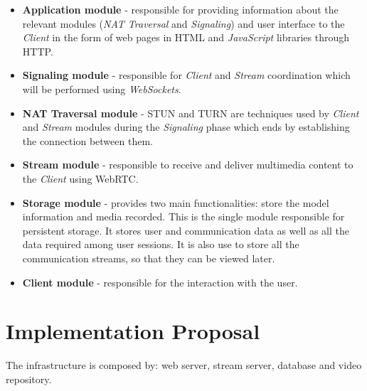 \begin{itemize}

\item \textbf{Application module} - responsible for providing information about the relevant modules (\emph{NAT Traversal} and \emph{Signaling}) and user interface to the \emph{Client} in the form of web pages in \ac{HTML} and \emph{JavaScript} libraries through \ac{HTTP}.
 
\item \textbf{Signaling module} - responsible for \emph{Client} and \emph{Stream} coordination which will be performed using \emph{WebSockets}.

 \item \textbf{NAT Traversal module} - \ac{STUN} and \ac{TURN} are techniques used by \emph{Client} and \emph{Stream} modules during the \emph{Signaling} phase which ends by establishing the connection between them.

 \item \textbf{Stream module} - responsible to receive and deliver multimedia content to the \emph{Client} using \ac{WebRTC}. 

 \item \textbf{Storage module} - provides two main functionalities: store the model information and media recorded. This is the single module responsible for persistent storage. It stores user and communication data as well as all the data required among user sessions. It is also use to store all the communication streams, so that they can be viewed later.

 \item \textbf{Client module} - responsible for the interaction with the user.

\end{itemize}



 
\section{Implementation Proposal}
The infrastructure is composed by: web server, stream server, database and video repository.

